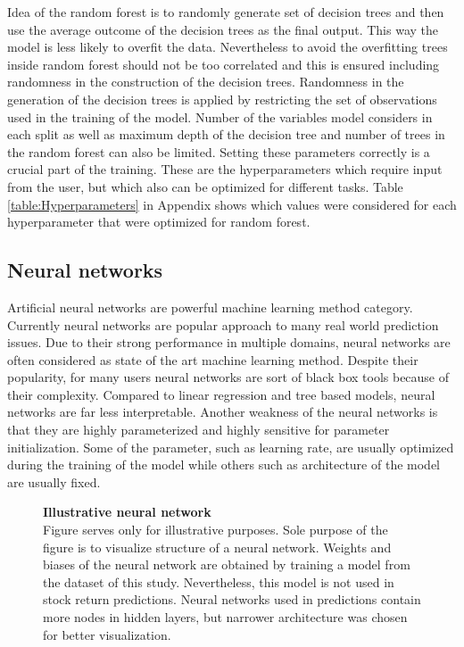 \documentclass[12pt]{article}
\begin{document}
Idea of the random forest is to randomly generate set of decision trees and then use the average outcome of the decision trees as the final output. This way the model is less likely to overfit the data. Nevertheless to avoid the overfitting trees inside random forest should not be too correlated and this is ensured including randomness in the construction of the decision trees. Randomness in the generation of the decision trees is applied by restricting the set of observations used in the training of the model. Number of the variables model considers in each split as well as maximum depth of the decision tree and number of trees in the random forest can also be limited. Setting these parameters correctly is a crucial part of the training. These are the hyperparameters which require input from the user, but which also can be optimized for different tasks. Table \ref{table:Hyperparameters} in Appendix shows which values were considered for each hyperparameter that were optimized for random forest. \par

\subsection{Neural networks}

Artificial neural networks are powerful machine learning method category. Currently neural networks are popular approach to many real world prediction issues. Due to their strong performance in multiple domains, neural networks are often considered as state of the art machine learning method. Despite their popularity, for many users neural networks are sort of black box tools because of their complexity. Compared to linear regression and tree based models, neural networks are far less interpretable. Another weakness of the neural networks is that they are highly parameterized and highly sensitive for parameter initialization. Some of the parameter, such as learning rate, are usually optimized during the training of the model while others such as architecture of the model are usually fixed.  \par

\begin{figure}[ht]
\centering
\caption[Illustrative neural network]{\textbf{Illustrative neural network}\\  Figure serves only for illustrative purposes. Sole purpose of the figure is to visualize structure of a neural network. Weights and biases of the neural network are obtained by training a model from the dataset of this study. Nevertheless, this model is not used in stock return predictions. Neural networks used in predictions contain more nodes in hidden layers, but narrower architecture was chosen for better visualization.}

\label{plot:NN}
\end{figure}
\end{document}
